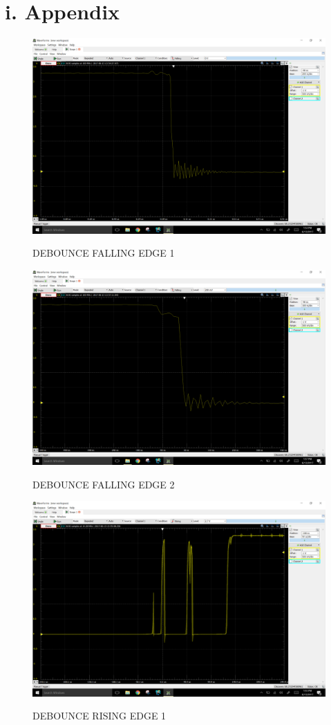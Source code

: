 \documentclass[11pt]{article}
\theoremstyle{plain}
\theoremstyle{definition}
\begin{document}
\section*{i. Appendix}
\begin{figure}[H]
	\centering
	\includegraphics[width=\textwidth]{3a}
	\label{fig:c}
	\caption{DEBOUNCE FALLING EDGE 1}
\end{figure}
\begin{figure}[H]
	\centering
	\includegraphics[width=\textwidth]{3b}
	\label{fig:c}
	\caption{DEBOUNCE FALLING EDGE 2}
\end{figure}
\begin{figure}[H]
	\centering
	\includegraphics[width=\textwidth]{3c}
	\label{fig:c}
	\caption{DEBOUNCE RISING EDGE 1}
\end{figure}
\end{document}
